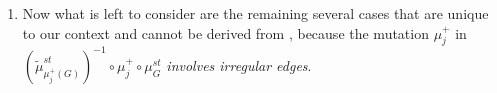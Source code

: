 \documentclass[12pt]{amsart}
\theoremstyle{plain}
\theoremstyle{remark}
\theoremstyle{definition}
\begin{document}
\begin{enumerate}
\begin{enumerate}
    $$ \mathcal{T}_i = P_i, \quad 3 \leq i \leq j-2 \text{ and } h+1 \leq i \leq m$$
   $$\mathcal{T}_{j-1} = (P_l \xrightarrow{\beta_l \dots \beta_j} P_{j-1} \xrightarrow{soc} P_{j-1})[2] $$
   $$\mathcal{T}_i = (P_l \xrightarrow{\begin{pmatrix} soc \\ -\beta_l\dots\beta_j \end{pmatrix}} P_{j-1} \oplus P_l \xrightarrow{\begin{pmatrix} 0 & -soc \\ \beta_l \dots \beta_{i+1} & 0 \end{pmatrix}} P_{j-1} \oplus P_i)[2], \quad j \leq i \leq l-1$$ 
   $$\mathcal{T}_i = (P_{i+1} \xrightarrow{\beta_{i+1} \dots \beta_{j}} P_{j-1} \xrightarrow{soc} P_{j-1})[2], \quad l \leq i \leq h-1$$ 
   $$ \mathcal{T}_h = P_{j-1}$$ 
   We have 
   $$\mathcal{H}(\Lambda) = (\mu_h^+)^2 \circ \dots \circ (\mu_{l+1}^+)^2 \circ (\mu_j^-)^2 \circ \dots \circ (\mu_{l-1}^-)^2 \circ (\mu_{l}^+)^2 \circ \dots \circ (\mu_j^+)^2(\Lambda) = t_h \circ \dots \circ t_{l+1} \circ t_j^{-1} \circ \dots \circ t_{l-1}^{-1} \circ t_l \circ \dots \circ t_j(\Lambda).$$ 
\end{enumerate}

\item Now what is left to consider are the remaining several cases that are unique to our context and cannot be derived from \cite{Alexandra}, because the mutation $\mu_j^+$ in $(\widetilde{\mu}_{\mu_j^+(G)}^{st})^{-1} \circ \mu_j^+ \circ \mu_G^{st}$ {\it involves irregular edges}. 

\begin{enumerate}


\end{enumerate}
\end{enumerate}
\end{document}
